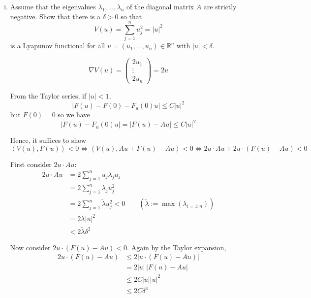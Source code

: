 \documentclass[12pt]{article}
\newcommand{\R}{\mathbb{R}}
\newcommand{\brak}[1]{\left\langle #1 \right\rangle}
\newcommand{\abs}[1]{\left\vert #1 \right\vert}
\begin{document}
\begin{enumerate}[(i)]
    \item Assume that the eigenvalues $\lambda_1,\ldots,\lambda_n$  of the diagonal matrix $A$ are strictly negative. Show that there is a $\delta>0$ so that
          \[
              V(u) = \sum_{j=1}^n u_j^2 = |u|^2
          \]
          is a Lyapunov functional for all $u=(u_1,\ldots,u_n)\in\R^n$ with $|u|<\delta$.


          \color{blue}
          \[\nabla V(u) = \begin{pmatrix}
                  2u_1   \\
                  \vdots \\
                  2u_n
              \end{pmatrix} = 2u\]

          From the Taylor series, if $\abs{u} <  1$,
          \[\abs{F(u) - F(0) - F_u(0)u} \leq C\abs{u}^2\]
          but $F(0) = 0$ so we have
          \[\abs{F(u) - F_u(0)u} = \abs{F(u) - Au} \leq C\abs u^2\]

          Hence, it suffices to show
          \[\brak{V(u), F(u)} < 0 \iff \brak{V(u), Au + F(u) - Au} < 0 \iff 2u \cdot Au + 2u \cdot (F(u) - Au) < 0 \]

          First consider $2u \cdot Au$:
          \begin{align*}
              2u \cdot Au & = 2\sum_{j=1}^{n} u_j \lambda_j u_j                                                       \\
                          & = 2\sum_{j=1}^{n} \lambda_j u_j^2                                                         \\
                          & = 2\sum_{j=1}^n \tilde \lambda u_j^2 < 0 \qquad (\tilde \lambda := \max(\lambda_{i=1:n})) \\
                          & =2\tilde \lambda \abs{u}^2                                                                \\
                          & < 2\tilde \lambda \delta^2
          \end{align*}

          Now consider $2u \cdot (F(u) - Au) < 0$. Again by the Taylor expansion,
          \begin{align*}
              2u \cdot (F(u) - Au) & \leq 2\abs{u \cdot (F(u) - Au)} \\
                                   & = 2\abs{u}\, \abs{F(u) - Au}    \\
                                   & \leq 2C \abs{u} \abs{u}^2       \\
                                   & \leq 2C \delta^3
          \end{align*}


\end{enumerate}
\end{document}
